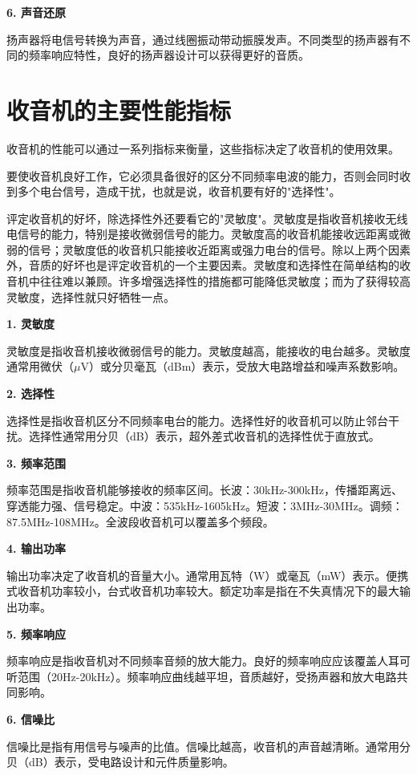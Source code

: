 \documentclass[12pt,UTF8]{ctexbook}
\begin{document}
\textbf{6. 声音还原}

扬声器将电信号转换为声音，通过线圈振动带动振膜发声。不同类型的扬声器有不同的频率响应特性，良好的扬声器设计可以获得更好的音质。

\section{收音机的主要性能指标}

收音机的性能可以通过一系列指标来衡量，这些指标决定了收音机的使用效果。

要使收音机良好工作，它必须具备很好的区分不同频率电波的能力，否则会同时收到多个电台信号，造成干扰，也就是说，收音机要有好的"选择性"。

评定收音机的好坏，除选择性外还要看它的"灵敏度"。灵敏度是指收音机接收无线电信号的能力，特别是接收微弱信号的能力。灵敏度高的收音机能接收远距离或微弱的信号；灵敏度低的收音机只能接收近距离或强力电台的信号。除以上两个因素外，音质的好坏也是评定收音机的一个主要因素。灵敏度和选择性在简单结构的收音机中往往难以兼顾。许多增强选择性的措施都可能降低灵敏度；而为了获得较高灵敏度，选择性就只好牺牲一点。

\textbf{1. 灵敏度}

灵敏度是指收音机接收微弱信号的能力。灵敏度越高，能接收的电台越多。灵敏度通常用微伏（$\mu$V）或分贝毫瓦（dBm）表示，受放大电路增益和噪声系数影响。

\textbf{2. 选择性}

选择性是指收音机区分不同频率电台的能力。选择性好的收音机可以防止邻台干扰。选择性通常用分贝（dB）表示，超外差式收音机的选择性优于直放式。

\textbf{3. 频率范围}

频率范围是指收音机能够接收的频率区间。长波：30kHz-300kHz，传播距离远、穿透能力强、信号稳定。中波：535kHz-1605kHz。短波：3MHz-30MHz。调频：87.5MHz-108MHz。全波段收音机可以覆盖多个频段。

\textbf{4. 输出功率}

输出功率决定了收音机的音量大小。通常用瓦特（W）或毫瓦（mW）表示。便携式收音机功率较小，台式收音机功率较大。额定功率是指在不失真情况下的最大输出功率。

\textbf{5. 频率响应}

频率响应是指收音机对不同频率音频的放大能力。良好的频率响应应该覆盖人耳可听范围（20Hz-20kHz）。频率响应曲线越平坦，音质越好，受扬声器和放大电路共同影响。

\textbf{6. 信噪比}

信噪比是指有用信号与噪声的比值。信噪比越高，收音机的声音越清晰。通常用分贝（dB）表示，受电路设计和元件质量影响。
\end{document}

